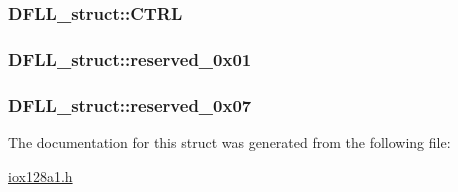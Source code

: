 \label{struct_d_f_l_l__struct_adca6783bcb9f4ffeb729efba3a6b0213}
\hypertarget{struct_d_f_l_l__struct_af2e5686437264ad16c39ffa2d3ed46e0}{
\subsubsection[{CTRL}]{ {\bf DFLL\_\-struct::CTRL}}}
\label{struct_d_f_l_l__struct_af2e5686437264ad16c39ffa2d3ed46e0}
\hypertarget{struct_d_f_l_l__struct_a3eb4a54008db96917e095a177c94eb1d}{
\subsubsection[{reserved\_\-0x01}]{ {\bf DFLL\_\-struct::reserved\_\-0x01}}}
\label{struct_d_f_l_l__struct_a3eb4a54008db96917e095a177c94eb1d}
\hypertarget{struct_d_f_l_l__struct_afb05d17c581ed91bc7755b03fa4d722a}{
\subsubsection[{reserved\_\-0x07}]{ {\bf DFLL\_\-struct::reserved\_\-0x07}}}
\label{struct_d_f_l_l__struct_afb05d17c581ed91bc7755b03fa4d722a}


The documentation for this struct was generated from the following file:\begin{DoxyCompactItemize}
\item 
\hyperlink{iox128a1_8h}{iox128a1.h}\end{DoxyCompactItemize}
